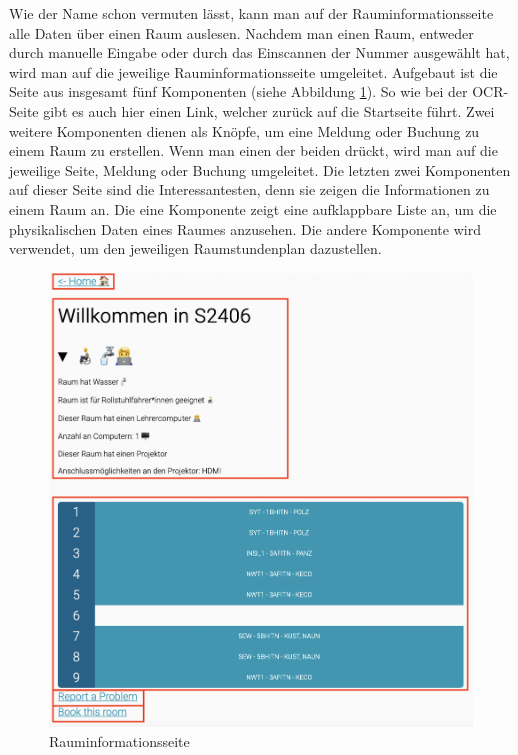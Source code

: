 
Wie der Name schon vermuten lässt, kann man auf der Rauminformationsseite alle Daten über einen Raum auslesen. Nachdem man einen Raum, entweder durch manuelle Eingabe oder durch das Einscannen der Nummer ausgewählt hat, wird man auf die jeweilige Rauminformationsseite umgeleitet. Aufgebaut ist die Seite aus insgesamt fünf Komponenten (siehe Abbildung \ref{fig:roominfoframes}). So wie bei der OCR-Seite gibt es auch hier einen Link, welcher zurück auf die Startseite führt. Zwei weitere Komponenten dienen als Knöpfe, um eine Meldung oder Buchung zu einem Raum zu erstellen. Wenn man einen der beiden drückt, wird man auf die jeweilige Seite, Meldung oder Buchung umgeleitet. Die letzten zwei Komponenten auf dieser Seite sind die Interessantesten, denn sie zeigen die Informationen zu einem Raum an. Die eine Komponente zeigt eine aufklappbare Liste an, um die physikalischen Daten eines Raumes anzusehen. Die andere Komponente wird verwendet, um den jeweiligen Raumstundenplan dazustellen.
\begin{figure}[H]
    \centering
    \includegraphics[width=120mm]{media/WebComponents/Rauminformationsseite_frames.png}
    \caption{Rauminformationsseite}
    \label{fig:roominfoframes}
\end{figure}

